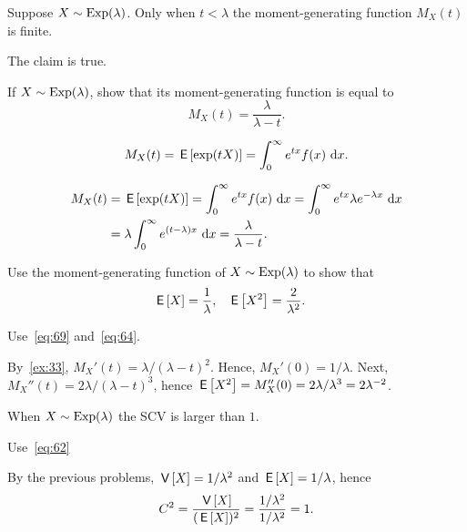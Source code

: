 \begin{extra}
  Suppose $X\sim\operatorname{Exp}(\lambda)$.
  Only when $t < \lambda$ the moment-generating function $M_X(t)$ is finite.
\begin{solution} The claim is true. 
\end{solution}
\end{extra}

\begin{extra}
 If $X\sim\operatorname{Exp}(\lambda)$, show that its moment-generating function is equal to
    \begin{equation*}
    M_X(t) = \frac{\lambda}{\lambda-t}.
    \end{equation*}
\begin{hint}
    \begin{equation*}
      M_X(t) = \,\mathsf{E}\left[\exp(t X)\right] =\int_0^\infty e^{t x} f(x) \,\,\text{d}x.
\end{equation*}
\end{hint}
\begin{solution}
    \begin{align*}
      M_X(t) &= \,\mathsf{E}\left[\exp(t X)\right]  
=\int_0^\infty e^{tx} f(x) \,\,\text{d}x 
=\int_0^\infty e^{tx} \lambda e^{-\lambda x} \,\,\text{d}x  \\
&=\lambda \int_0^\infty e^{(t-\lambda)x} \,\,\text{d}x 
=\frac{\lambda}{\lambda -t}.
    \end{align*}
\end{solution}
  \end{extra}

\begin{exercise}
Use the moment-generating function  of $X\sim\operatorname{Exp}(\lambda)$  to show that
    \begin{align*}
      \,\mathsf{E}\left[X\right] &=\frac1\lambda, & 
      \,\mathsf{E}\left[X^2\right] &=\frac2{\lambda^2}.
    \end{align*}
\begin{hint}
Use~\cref{eq:69} and~\cref{eq:64}.
\end{hint}
\begin{solution} By~\cref{ex:33}, 
  $ M_X'(t)=\lambda/(\lambda-t)^2$. Hence, $M_X'(0)=1/\lambda$. Next, $M_X''(t)=2\lambda/(\lambda-t)^3$, hence $\,\mathsf{E}\left[X^2\right]=M_X''(0)=2\lambda/\lambda^3=2\lambda^{-2}$. 
\end{solution}
  \end{exercise}

\begin{extra}
When  $X\sim\operatorname{Exp}(\lambda)$ the SCV is larger than $1$.
\begin{hint}
  Use~\cref{eq:62} 
\end{hint}
\begin{solution}
  By the previous problems, $\,\mathsf{V}\left[X\right] = 1/\lambda^2$ and $\,\mathsf{E}\left[X\right]=1/\lambda$, hence
  \begin{equation*}
    C^2= \frac{\,\mathsf{V}\left[X\right]}{(\,\mathsf{E}\left[X\right])^2} = \frac{1/\lambda^2}{1/\lambda^2} = 1.
  \end{equation*}
\end{solution}
\end{extra}

